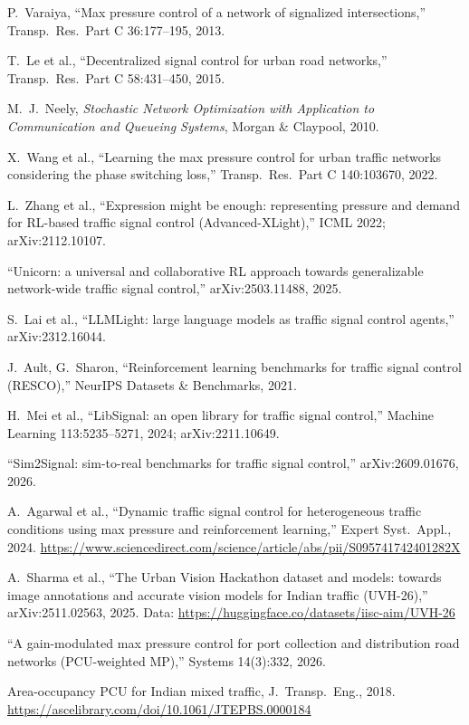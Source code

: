 \documentclass[11pt,a4paper]{article}
\begin{document}
\begin{enumerate}[label={[\arabic*]},leftmargin=*]
\item P.~Varaiya, ``Max pressure control of a network of signalized intersections,''
  Transp.\ Res.\ Part C 36:177--195, 2013.
\item T.~Le et al., ``Decentralized signal control for urban road networks,'' Transp.\ Res.\
  Part C 58:431--450, 2015.
\item M.~J.~Neely, \emph{Stochastic Network Optimization with Application to Communication
  and Queueing Systems}, Morgan \& Claypool, 2010.
\item X.~Wang et al., ``Learning the max pressure control for urban traffic networks
  considering the phase switching loss,'' Transp.\ Res.\ Part C 140:103670, 2022.
\item L.~Zhang et al., ``Expression might be enough: representing pressure and demand for
  RL-based traffic signal control (Advanced-XLight),'' ICML 2022; arXiv:2112.10107.
\item ``Unicorn: a universal and collaborative RL approach towards generalizable
  network-wide traffic signal control,'' arXiv:2503.11488, 2025.
\item S.~Lai et al., ``LLMLight: large language models as traffic signal control agents,''
  arXiv:2312.16044.
\item J.~Ault, G.~Sharon, ``Reinforcement learning benchmarks for traffic signal control
  (RESCO),'' NeurIPS Datasets \& Benchmarks, 2021.
\item H.~Mei et al., ``LibSignal: an open library for traffic signal control,'' Machine
  Learning 113:5235--5271, 2024; arXiv:2211.10649.
\item ``Sim2Signal: sim-to-real benchmarks for traffic signal control,'' arXiv:2609.01676,
  2026.
\item A.~Agarwal et al., ``Dynamic traffic signal control for heterogeneous traffic
  conditions using max pressure and reinforcement learning,'' Expert Syst.\ Appl., 2024.
  \url{https://www.sciencedirect.com/science/article/abs/pii/S095741742401282X}
\item A.~Sharma et al., ``The Urban Vision Hackathon dataset and models: towards image
  annotations and accurate vision models for Indian traffic (UVH-26),'' arXiv:2511.02563,
  2025. Data: \url{https://huggingface.co/datasets/iisc-aim/UVH-26}
\item ``A gain-modulated max pressure control for port collection and distribution road
  networks (PCU-weighted MP),'' Systems 14(3):332, 2026.
\item Area-occupancy PCU for Indian mixed traffic, J.\ Transp.\ Eng., 2018.
  \url{https://ascelibrary.com/doi/10.1061/JTEPBS.0000184}
\end{enumerate}
\normalsize
\end{document}
